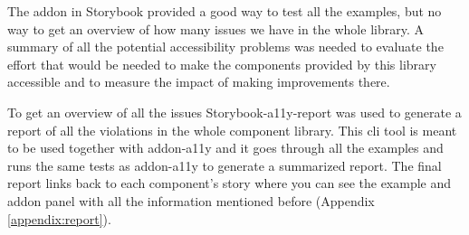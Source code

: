 \documentclass{master_thesis}
\begin{document}
The addon in Storybook provided a good way to test all the examples, but no way to get an overview of how many issues we have in the whole library. A summary of all the potential accessibility problems was needed to evaluate the effort that would be needed to make the components provided by this library accessible and to measure the impact of making improvements there.

To get an overview of all the issues Storybook-a11y-report \citep{Karube2020} was used to generate a report of all the violations in the whole component library. This \ac{cli} tool is meant to be used together with addon-a11y and it goes through all the examples and runs the same tests as addon-a11y to generate a summarized report. The final report links back to each component's story where you can see the example and addon panel with all the information mentioned before (Appendix \ref{appendix:report}).
\end{document}
